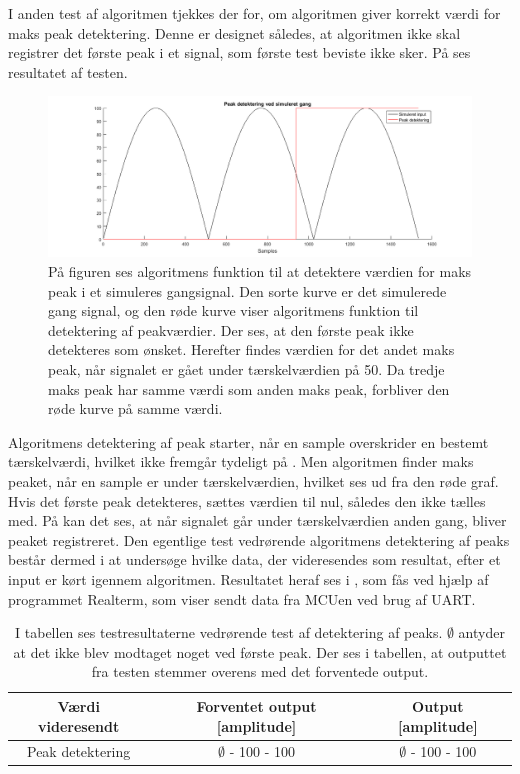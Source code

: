 I anden test af algoritmen tjekkes der for, om algoritmen giver korrekt værdi for maks peak detektering. Denne er designet således, at algoritmen ikke skal registrer det første peak i et signal, som første test beviste ikke sker. På  ses resultatet af testen.
\begin{figure}[H]
	\centering
	\includegraphics[width=.9\textwidth]{figures/cDesign/test_peak_gang.png}
	\caption{På figuren ses algoritmens funktion til at detektere værdien for maks peak i et simuleres gangsignal. Den sorte kurve er det simulerede gang signal, og den røde kurve viser algoritmens funktion til detektering af peakværdier. Der ses, at den første peak ikke detekteres som ønsket. Herefter findes værdien for det andet maks peak, når signalet er gået under tærskelværdien på 50. Da tredje maks peak har samme værdi som anden maks peak, forbliver den røde kurve på samme værdi.}
	\label{fig:test_peak_gang}
\end{figure}\vspace{-.5cm}
Algoritmens detektering af peak starter, når en sample overskrider en bestemt tærskelværdi, hvilket ikke fremgår tydeligt på . Men algoritmen finder maks peaket, når en sample er under tærskelværdien, hvilket ses ud fra den røde graf. Hvis det første peak detekteres, sættes værdien til nul, således den ikke tælles med. På  kan det ses, at når signalet går under tærskelværdien anden gang, bliver peaket registreret. Den egentlige test vedrørende algoritmens detektering af peaks består dermed i at undersøge hvilke data, der videresendes som resultat, efter et input er kørt igennem algoritmen. Resultatet heraf ses i , som fås ved hjælp af programmet Realterm, som viser sendt data fra MCUen ved brug af UART.
\begin{table}[H]
	\centering
	\begin{tabular}{ccc}
		\hline
		\rowcolor[HTML]{C0C0C0} 
		Værdi videresendt & Forventet output [amplitude] & Output [amplitude] \\ \hline
		Peak detektering & $\emptyset$ - 100 - 100 & $\emptyset$ - 100 - 100 \\ \hline
	\end{tabular}
	\caption{I tabellen ses testresultaterne vedrørende test af detektering af peaks. $\emptyset$ antyder at det ikke blev modtaget noget ved første peak. Der ses i tabellen, at outputtet fra testen stemmer overens med det forventede output.}
	\label{tab:test_res_peak}
\end{table}\vspace{-0.5cm}
